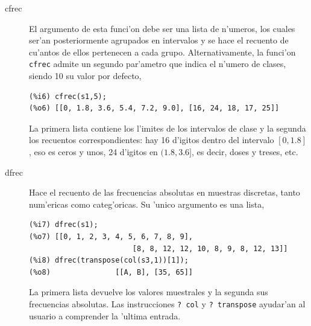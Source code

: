 \documentclass[spanish,12pt,a4paper]{article}
\begin{document}
\begin{description}

\item[cfrec] El argumento de esta funci'on debe ser una lista de n'umeros, los cuales ser'an posteriormente agrupados en intervalos y se hace el recuento de cu'antos de ellos pertenecen a cada grupo. Alternativamente, la funci'on \verb|cfrec| admite un segundo par'ametro que indica el n'umero de clases, siendo 10 su valor por defecto,
\begin{verbatim}
(%i6) cfrec(s1,5);
(%o6) [[0, 1.8, 3.6, 5.4, 7.2, 9.0], [16, 24, 18, 17, 25]]
\end{verbatim}
La primera lista contiene los l'imites de los intervalos de clase y la segunda los recuentos correspondientes: hay 16 d'igitos dentro del intervalo $[0, 1.8]$, eso es ceros y unos, 24 d'igitos en $(1.8, 3.6]$, es decir, doses y treses, etc.

\item[dfrec] Hace el recuento de las frecuencias absolutas en muestras discretas, tanto num'ericas como categ'oricas. Su 'unico argumento es una lista,
\begin{verbatim}
(%i7) dfrec(s1);
(%o7) [[0, 1, 2, 3, 4, 5, 6, 7, 8, 9],
                        [8, 8, 12, 12, 10, 8, 9, 8, 12, 13]]
(%i8) dfrec(transpose(col(s3,1))[1]);
(%o8)               [[A, B], [35, 65]]
\end{verbatim}
La primera lista devuelve los valores muestrales y la segunda sus frecuencias absolutas. Las instrucciones \verb|? col| y \verb|? transpose| ayudar'an al usuario a comprender la 'ultima entrada.


\end{description}
\end{document}
